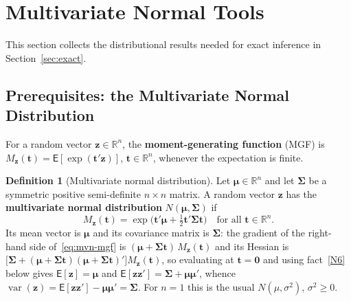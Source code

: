 \documentclass[12pt,a4paper]{article}
\theoremstyle{definition}
\newtheorem{definition}[theorem]{Definition}
\newcommand\expc{\mathsf{E}}
\DeclareMathOperator\var{var}
\newcommand{\bzero}{\mathbf{0}}
\newcommand{\bz}{\mathbf{z}}
\newcommand{\Real}{\mathbb{R}}
\begin{document}
\section{Multivariate Normal Tools}\label{sec:mvn}

This section collects the distributional results needed for exact inference in Section~\ref{sec:exact}.

\subsection{Prerequisites: the Multivariate Normal Distribution}\label{sec:prereq-prob}

For a random vector $\bz \in \Real^n$, the \textbf{moment-generating function} (MGF) is $M_{\bz}(\mathbf{t}) = \expc[\exp(\mathbf{t}'\bz)]$, $\mathbf{t} \in \Real^n$, whenever the expectation is finite.

\begin{definition}[Multivariate normal distribution]\label{def:mvn}
Let $\boldsymbol\mu \in \Real^n$ and let $\boldsymbol\Sigma$ be a symmetric positive semi-definite $n \times n$ matrix. A random vector $\bz$ has the \textbf{multivariate normal distribution} $N(\boldsymbol\mu, \boldsymbol\Sigma)$ if
\begin{equation}\label{eq:mvn-mgf}
M_{\bz}(\mathbf{t}) = \exp\bigl(\mathbf{t}'\boldsymbol\mu + \tfrac{1}{2}\mathbf{t}'\boldsymbol\Sigma\mathbf{t}\bigr) \quad \text{for all } \mathbf{t} \in \Real^n.
\end{equation}
Its mean vector is $\boldsymbol\mu$ and its covariance matrix is $\boldsymbol\Sigma$: the gradient of the right-hand side of~\eqref{eq:mvn-mgf} is $(\boldsymbol\mu + \boldsymbol\Sigma\mathbf{t})\,M_{\bz}(\mathbf{t})$ and its Hessian is $\bigl[\boldsymbol\Sigma + (\boldsymbol\mu + \boldsymbol\Sigma\mathbf{t})(\boldsymbol\mu + \boldsymbol\Sigma\mathbf{t})'\bigr]M_{\bz}(\mathbf{t})$, so evaluating at $\mathbf{t} = \bzero$ and using fact~\ref{N6} below gives $\expc[\bz] = \boldsymbol\mu$ and $\expc[\bz\bz'] = \boldsymbol\Sigma + \boldsymbol\mu\boldsymbol\mu'$, whence $\var(\bz) = \expc[\bz\bz'] - \boldsymbol\mu\boldsymbol\mu' = \boldsymbol\Sigma$. For $n = 1$ this is the usual $N(\mu, \sigma^2)$, $\sigma^2 \geqslant 0$.
\end{definition}
\end{document}
